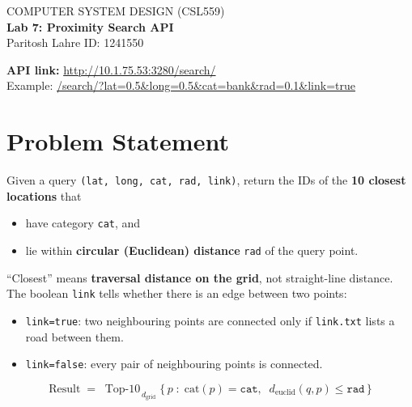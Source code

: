 \documentclass[11pt,a4paper]{article}
\newcommand{\code}[1]{\texttt{#1}}
\begin{document}
\begin{tcolorbox}[enhanced, colback=accent, colframe=accent, arc=0pt,
  left=12pt, right=12pt, top=10pt, bottom=10pt]
  \color{white}\sffamily
  {\small COMPUTER SYSTEM DESIGN (CSL559)}\\[4pt]
  {\LARGE\bfseries Lab 7: Proximity Search API}\\[8pt]
  {\normalsize Paritosh Lahre \quad\textbar\quad ID: 1241550}
\end{tcolorbox}

\begin{tcolorbox}[enhanced, colback=white, colframe=accent, boxrule=0.8pt, arc=2pt,
  left=10pt, right=10pt, top=6pt, bottom=6pt]
  \sffamily\textbf{\color{accent}API link:}\enspace
  \href{http://10.1.75.53:3280/search/}{\ttfamily http://10.1.75.53:3280/search/}\\[3pt]
  {\small\color{muted}Example:\enspace
  \ttfamily\href{http://10.1.75.53:3280/search/?lat=0.5&long=0.5&cat=bank&rad=0.1&link=true}{/search/?lat=0.5\&long=0.5\&cat=bank\&rad=0.1\&link=true}}
\end{tcolorbox}

\section{Problem Statement}

Given a query \code{(lat, long, cat, rad, link)}, return the IDs of the
\textbf{10 closest locations} that
\begin{itemize}
  \item have category \code{cat}, and
  \item lie within \textbf{circular (Euclidean) distance} \code{rad} of the query point.
\end{itemize}
``Closest'' means \textbf{traversal distance on the grid}, not straight-line distance.
The boolean \code{link} tells whether there is an edge between two points:
\begin{itemize}
  \item \code{link=true}: two neighbouring points are connected only if \code{link.txt} lists a road between them.
  \item \code{link=false}: every pair of neighbouring points is connected.
\end{itemize}

\[
\text{Result} \;=\; \operatorname{Top\text{-}10}_{\,d_{\text{grid}}}
\bigl\{\, p \;:\; \text{cat}(p)=\code{cat},\;\; d_{\text{euclid}}(q,p)\le \code{rad} \,\bigr\}
\]
\end{document}
